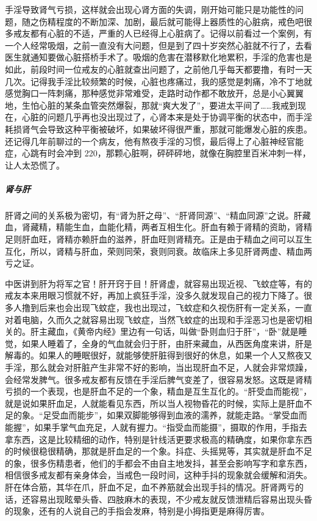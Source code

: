 手淫导致肾气亏损，这样就会出现心肾方面的失调，刚开始可能只是功能性的问题，随之伤精程度的不断加深、加剧，最后就可能得上器质性的心脏病，戒色吧很多戒友都有心脏的不适，严重的人已经得上心脏病了。记得以前看过一个案例，有一个人经常吸烟，之前一直没有大问题，但是到了四十岁突然心脏就不行了，去看医生就通知要做心脏搭桥手术了。吸烟的危害在潜移默化地累积，手淫的危害也是如此，前段时间一位戒友的心脏就查出问题了，之前他几乎每天都要撸，有时一天几次。记得我手淫比较频繁的时候，心脏也疼痛过，我的感觉是刺痛，冷不丁地就感觉胸口一阵刺痛，那种感觉非常难受，走路时动作都不敢放开，总是小心翼翼地，生怕心脏的某条血管突然爆裂，那就“爽大发了”，要进太平间了……我戒到现在，心脏的问题几乎再也没出现过了，心肾本来是处于协调平衡的状态中，而手淫耗损肾气会导致这种平衡被破坏，如果破坏得很严重，那就可能爆发心脏的疾患。还记得几年前聊过的一个病友，他有熬夜手淫的习惯，最后得上了心脏神经官能症，心跳有时会冲到 220，那颗心脏啊，砰砰砰地，就像在胸腔里百米冲刺一样，让人太恐慌了。

\subparagraph{肾与肝}

肝肾之间的关系极为密切，有“肾为肝之母”、“肝肾同源”、“精血同源”之说。肝藏血，肾藏精，精能生血，血能化精，两者互相生化。肝血有赖于肾精的资助，肾精足则肝血旺，肾精亦赖肝血的滋养，肝血旺则肾精充。正是由于精血之间可以互生互化，所以，肾精与肝血，荣则同荣，衰则同衰。故临床上多见肝肾两虚、精血两亏之证。

中医讲到肝为将军之官！肝开窍于目！肝肾虚，就容易出现近视、飞蚊症等，有的戒友本来用眼习惯就不好，再加上疯狂手淫，没多久就发现自己的视力下降了。很多人撸到后来也会出现飞蚊症，我也出现过，飞蚊症和久视伤肝有一定关系，一直对着电脑，久而久之就容易出现飞蚊症，当然飞蚊症的出现和手淫恶习也是密切相关的。肝主藏血，《黄帝内经》里边有一句话，叫做“卧则血归于肝”，“卧”就是睡觉，如果人睡着了，全身的气血就会归于肝，由肝来藏血，从西医角度来讲，肝是解毒的。如果人的睡眠很好，就能够使肝脏得到很好的休息，如果一个人又熬夜又手淫，那么就会对肝脏产生非常不好的影响，当出现肝血不足，人就会非常烦躁，会经常发脾气。很多戒友都有反馈在手淫后脾气变差了，很容易发怒。这既是肾精亏损的一个表现，也是肝血不足的一个象，精血是互生互化的。“肝受血而能视”，就是说如果肝血足，人就能看见东西，所以当人视物昏花的时候，实际上是肝血不足的象。“足受血而能步”，如果双脚能够得到血液的濡养，就能走路。“掌受血而能握”，如果手掌气血充足，人就有握力。“指受血而能摄”，摄取的作用，手指去拿东西，这是比较精细的动作，特别是针线活更要求极高的精确度，如果你拿东西的时候很稳很精确，那就是肝血足的一个象。抖症、头摇晃等，其实就是肝血不足的象，很多伤精患者，他们的手都会不由自主地发抖，甚至会影响写字和拿东西，相信很多戒友都有亲身体会，当戒色一段时间，这种手抖的现象就会缓解和消失。肝在体合筋，其华在爪，肝血不足，血不养筋就会出现手抖的情况。肝肾两亏的话，还容易出现眩晕头昏、四肢麻木的表现，不少戒友就反馈泄精后容易出现头昏的现象，还有的人说自己的手指会发麻，特别是小拇指更是麻得厉害。

